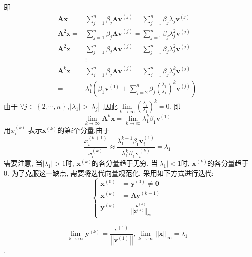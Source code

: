 \documentclass{article}
\begin{document}
\begin{CJK*}{UTF8}{song}
					即
					$$
					\begin{aligned}
						\mathbf{Ax} = &\sum_{j=1}^{n} \beta_j \mathbf{Av}^{\left(j\right)} = \sum_{j=1}^{n} \beta_j \lambda_j \mathbf{v}^{\left(j\right)} \\
						\mathbf{A}^2\mathbf{x} = &\sum_{j=1}^{n} \beta_j \mathbf{Av}^{\left(j\right)} = \sum_{j=1}^{n} \beta_j \lambda_j^2 \mathbf{v}^{\left(j\right)} \\
						\mathbf{A}^2\mathbf{x} = &\sum_{j=1}^{n} \beta_j \mathbf{Av}^{\left(j\right)} = \sum_{j=1}^{n} \beta_j \lambda_j^2 \mathbf{v}^{\left(j\right)} \\
						&\vdots \\
						\mathbf{A}^k\mathbf{x} =& \sum_{j=1}^{n} \beta_j \mathbf{Av}^{\left(j\right)} = \sum_{j=1}^{n} \beta_j \lambda_j^k \mathbf{v}^{\left(j\right)} \\
						= &\lambda_1^k\left(\beta_1 \mathbf{v}^{\left(1\right)} + \sum_{j=2}^{n}\beta_j\left(\frac{\lambda_j}{\lambda_1}\right)^k\mathbf{v}^{\left(j\right)}\right)
					\end{aligned}$$
					由于
					$\forall j \in \left\{2,\cdots,n\right\}, \left|\lambda_1\right| > \left|\lambda_j\right|$
					,因此$\lim\limits_{k \to \infty}  \left(\frac{\lambda_j}{\lambda_1}\right)^k= 0$. 即
					$$\lim\limits_{k \to \infty} \mathbf{A}^k \mathbf{x} = \lim\limits_{k \to \infty}\lambda_1^k \beta_1 \mathbf{v}^{\left(1\right)}$$
					用$x_i^{\left(k\right)}$ 表示$\mathbf{x}^{\left(k\right)}$的第$i$个分量.由于
					$$\frac{x_i^{\left(k+1\right)}}{x_i^{\left(k\right)}} \approx \frac{\lambda_1^{k+1} \beta_1 \mathbf{v}_i^{\left(1\right)}}{\lambda_1^k \beta_1 \mathbf{v}_i^{\left(k\right)}} = \lambda_1$$
					需要注意, 当$\left|\lambda_1 \right| > 1$时, $\mathbf{x}^{\left(k\right)}$的各分量趋于无穷, 当$\left|\lambda_1\right| < 1$时, $\mathbf{x}^{\left(k\right)}$的各分量趋于0. 为了克服这一缺点, 需要将迭代向量规范化. 采用如下方式进行迭代:
					$$
					\left\{
						\begin{aligned}
							\mathbf{x}^{\left(0\right)} &= \mathbf{y}^{\left(0\right)} \neq \mathbf{0} \\
							\mathbf{x}^{\left(k\right)} &= \mathbf{Ay}^{\left(k-1\right)} \\
							\mathbf{y}^{\left(k\right)} & = \frac{\mathbf{x}^{\left(k\right)}}{\left|  \left|\mathbf{x}^{\left(k\right)} \right|\right|_{\infty}}
						\end{aligned}
					\right.$$
					
					$$\lim\limits_{k \to \infty} \mathbf{y}^{\left(k\right)} = \frac{v^{\left(1\right)}}{\left|\left|\mathbf{v}^{\left(1\right)} \right| \right|}, \lim\limits_{k \to \infty} \left|\left|\mathbf{x} \right| \right|_{\infty } = \lambda_1$$.
					

\end{CJK*}
\end{document}

